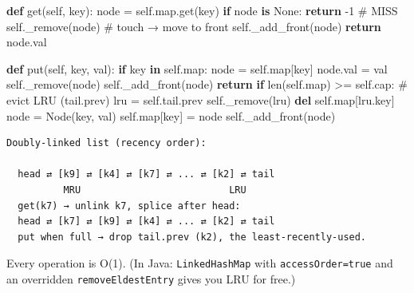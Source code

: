 \documentclass[11pt]{article}
\newenvironment{Shaded}{\begin{snugshade}}{\end{snugshade}}
\newcommand{\BuiltInTok}[1]{\textcolor[rgb]{0.50,0.55,0.55}{#1}}
\newcommand{\CommentTok}[1]{\textcolor[rgb]{0.48,0.49,0.49}{#1}}
\newcommand{\ControlFlowTok}[1]{\textcolor[rgb]{0.99,0.74,0.29}{\textbf{#1}}}
\newcommand{\DecValTok}[1]{\textcolor[rgb]{0.96,0.45,0.00}{#1}}
\newcommand{\KeywordTok}[1]{\textcolor[rgb]{0.81,0.81,0.76}{\textbf{#1}}}
\newcommand{\NormalTok}[1]{\textcolor[rgb]{0.81,0.81,0.76}{#1}}
\newcommand{\OperatorTok}[1]{\textcolor[rgb]{0.81,0.81,0.76}{#1}}
\newcommand{\VariableTok}[1]{\textcolor[rgb]{0.15,0.68,0.68}{#1}}
\begin{document}
\begin{Shaded}
\begin{Highlighting}[]
    \KeywordTok{def}\NormalTok{ get(}\VariableTok{self}\NormalTok{, key):}
\NormalTok{        node }\OperatorTok{=} \VariableTok{self}\NormalTok{.}\BuiltInTok{map}\NormalTok{.get(key)}
        \ControlFlowTok{if}\NormalTok{ node }\KeywordTok{is} \VariableTok{None}\NormalTok{:}
            \ControlFlowTok{return} \OperatorTok{{-}}\DecValTok{1}                 \CommentTok{\# MISS}
        \VariableTok{self}\NormalTok{.\_remove(node)            }\CommentTok{\# touch → move to front}
        \VariableTok{self}\NormalTok{.\_add\_front(node)}
        \ControlFlowTok{return}\NormalTok{ node.val}

    \KeywordTok{def}\NormalTok{ put(}\VariableTok{self}\NormalTok{, key, val):}
        \ControlFlowTok{if}\NormalTok{ key }\KeywordTok{in} \VariableTok{self}\NormalTok{.}\BuiltInTok{map}\NormalTok{:}
\NormalTok{            node }\OperatorTok{=} \VariableTok{self}\NormalTok{.}\BuiltInTok{map}\NormalTok{[key]}
\NormalTok{            node.val }\OperatorTok{=}\NormalTok{ val}
            \VariableTok{self}\NormalTok{.\_remove(node)}
            \VariableTok{self}\NormalTok{.\_add\_front(node)}
            \ControlFlowTok{return}
        \ControlFlowTok{if} \BuiltInTok{len}\NormalTok{(}\VariableTok{self}\NormalTok{.}\BuiltInTok{map}\NormalTok{) }\OperatorTok{\textgreater{}=} \VariableTok{self}\NormalTok{.cap:           }\CommentTok{\# evict LRU (tail.prev)}
\NormalTok{            lru }\OperatorTok{=} \VariableTok{self}\NormalTok{.tail.prev}
            \VariableTok{self}\NormalTok{.\_remove(lru)}
            \KeywordTok{del} \VariableTok{self}\NormalTok{.}\BuiltInTok{map}\NormalTok{[lru.key]}
\NormalTok{        node }\OperatorTok{=}\NormalTok{ Node(key, val)}
        \VariableTok{self}\NormalTok{.}\BuiltInTok{map}\NormalTok{[key] }\OperatorTok{=}\NormalTok{ node}
        \VariableTok{self}\NormalTok{.\_add\_front(node)}
\end{Highlighting}
\end{Shaded}

\setcodelang{}

\begin{verbatim}
Doubly-linked list (recency order):

  head ⇄ [k9] ⇄ [k4] ⇄ [k7] ⇄ ... ⇄ [k2] ⇄ tail
          MRU                          LRU
  get(k7) → unlink k7, splice after head:
  head ⇄ [k7] ⇄ [k9] ⇄ [k4] ⇄ ... ⇄ [k2] ⇄ tail
  put when full → drop tail.prev (k2), the least-recently-used.
\end{verbatim}

Every operation is O(1). (In Java: \texttt{LinkedHashMap} with \texttt{accessOrder=true} and an overridden \texttt{removeEldestEntry} gives you LRU for free.)
\end{document}
